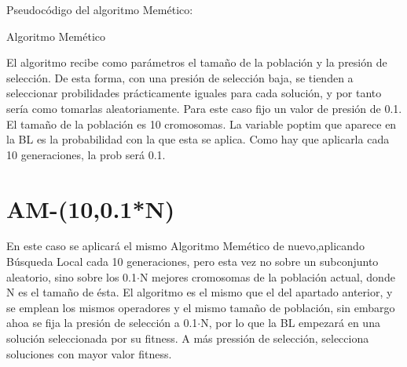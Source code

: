 \documentclass[	DIV=calc,%
							paper=a4,%
							fontsize=11pt,
							onecolumn]{scrartcl}	 					%
\makeatletter
\def\BState{\State\hskip-\ALG@thistlm}
\makeatother
\begin{document}
Pseudocódigo del algoritmo Memético:
\begin{algorithm}[H]
\caption{Algoritmo Memético}\label{euclid}
\end{algorithm}

El algoritmo recibe como parámetros el tamaño de la población y la presión de selección. De esta forma, con una presión de selección baja, se tienden a seleccionar probilidades prácticamente iguales para cada solución, y por tanto sería como tomarlas aleatoriamente. Para este caso fijo un valor de presión de 0.1. El tamaño de la población es 10 cromosomas. La variable poptim que aparece en la BL es la probabilidad con la que esta se aplica. Como hay que aplicarla cada 10 generaciones, la prob será 0.1.

\section*{AM-(10,0.1*N)}
En este caso se aplicará el mismo Algoritmo Memético de nuevo,aplicando Búsqueda Local cada 10 generaciones, pero esta vez no sobre un subconjunto aleatorio, sino sobre los 0.1$\cdot$N mejores cromosomas de la población actual, donde N es el tamaño de ésta. \newline
El algoritmo es el mismo que el del apartado anterior, y se emplean los mismos operadores y el mismo tamaño de población, sin embargo ahoa se fija la presión de selección a 0.1$\cdot$N, por lo que la BL empezará en una solución seleccionada por su fitness. A más pressión de selección, selecciona soluciones con mayor valor fitness.
\end{document}
